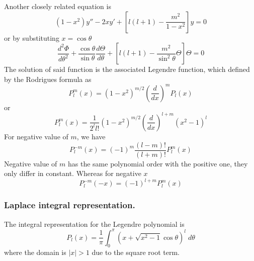 \documentclass[../../../main.tex]{subfiles}
\begin{document}
Another closely related equation is
\begin{equation*}
    (1-x^2)y''-2xy'+\left[l(l+1)-\frac{m^2}{1-x^2}\right]y =0
\end{equation*}
or by substituting $x=\cos\theta$
\begin{equation*}
    \frac{d^2\Phi}{d\theta^2} +\frac{\cos \theta}{\sin\theta}\frac{d\Theta}{d\theta} +\left[l(l+1)-\frac{m^2}{\sin^2\theta}\Theta \right]\Theta =0
\end{equation*}
The solution of said function is the associated Legendre function, which defined by the Rodrigues formula as
\begin{equation*}
    P_l^m(x)=(1-x^2)^{m/2}\left(\frac{d}{dx}\right)^{m}P_l(x)
\end{equation*}
or
\begin{equation*}
    P_l^m(x)=\frac{1}{2^ll!}(1-x^2)^{m/2}\left(\frac{d}{dx}\right)^{l+m}(x^2-1)^l
\end{equation*}
For negative value of $m$, we have
\begin{equation*}
    P_l^{-m}(x)=(-1)^m\frac{(l-m)!}{(l+m)!}P_l^m(x)
\end{equation*}
Negative value of $m$ has the same polynomial order with the positive one, they only differ in constant.
Whereas for negative $x$
\begin{equation*}
    P_l^{-m}(-x)=(-1)^{l+m}P_l^m(x)
\end{equation*}


\subsubsection{Laplace integral representation.} The integral representation for the Legendre polynomial is
\begin{equation*}
    P_l(x)=\frac{1}{\pi}\int_{0}^{\pi}\left(x+\sqrt{x^2-1}\cos\theta\right)^l\;d\theta
\end{equation*}
where the domain is $|x|>1$ due to the square root term.
\end{document}
